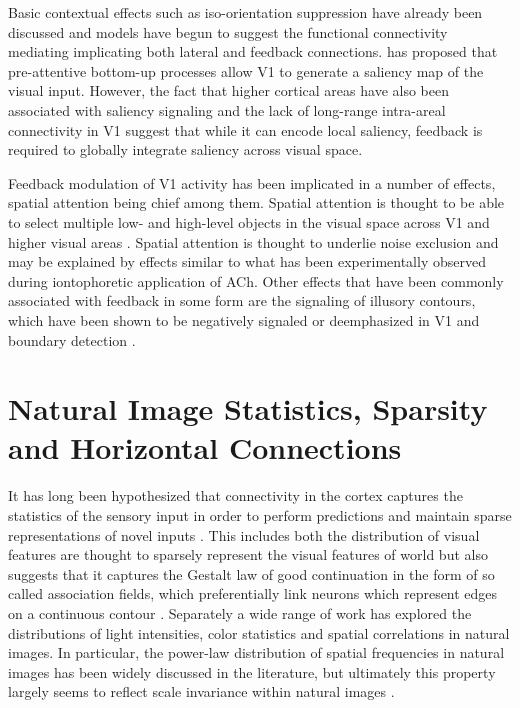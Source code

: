 Basic contextual effects such as iso-orientation suppression have
already been discussed and models have begun to suggest the functional
connectivity mediating implicating both lateral and feedback
connections. \cite{Li2002} has proposed that pre-attentive
bottom-up processes allow V1 to generate a saliency map of the visual
input. However, the fact that higher cortical areas have also been
associated with saliency signaling and the lack of long-range
intra-areal connectivity in V1 suggest that while it can encode local
saliency, feedback is required to globally integrate saliency across
visual space.

Feedback modulation of V1 activity has been implicated in a number of
effects, spatial attention being chief among them. Spatial attention
is thought to be able to select multiple low- and high-level objects in
the visual space across V1 and higher visual areas
\citep{McMains2004}. Spatial attention is thought to underlie noise
exclusion \citep{Dosher2000} and may be explained by effects similar
to what has been experimentally observed during iontophoretic application
of ACh. Other effects that have been commonly associated with
feedback in some form are the signaling of illusory contours, which
have been shown to be negatively signaled or deemphasized in V1
\citep{Ramsden2001} and boundary detection \citep{Poort2012}.

\section{Natural Image Statistics, Sparsity and Horizontal Connections}

It has long been hypothesized that connectivity in the cortex captures
the statistics of the sensory input in order to perform predictions
and maintain sparse representations of novel inputs \citep{Field1993,
  Simoncelli2001}. This includes both the distribution of visual
features are thought to sparsely represent the visual features of
world \citep{Olshausen1996} but also suggests that it captures the
Gestalt law of good continuation in the form of so called association
fields, which preferentially link neurons which represent edges on a
continuous contour \citep{Field1993}. Separately a wide range of work
has explored the distributions of light intensities, color statistics
and spatial correlations in natural images. In particular, the
power-law distribution of spatial frequencies in natural images has
been widely discussed in the literature, but ultimately this property
largely seems to reflect scale invariance within natural images
\citep{Ruderman1997}.

